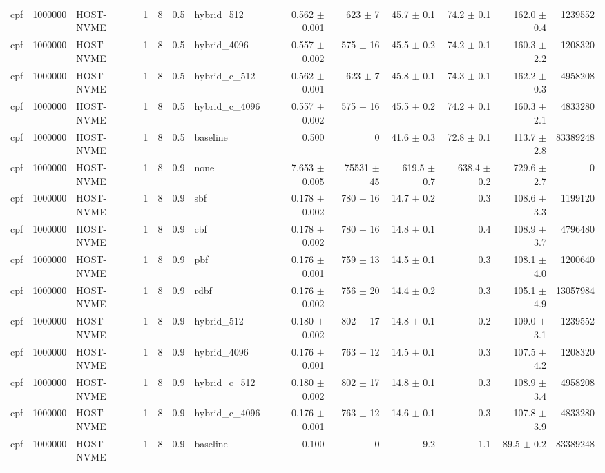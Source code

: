 \begin{tabular}{lllllllrrrrrr}
cpf & 1000000 & HOST-NVME & 1 & 8 & 0.5 & hybrid\_512 & 0.562 $\pm$ 0.001 & 623 $\pm$ 7 & 45.7 $\pm$ 0.1 & 74.2 $\pm$ 0.1 & 162.0 $\pm$ 0.4 & 1239552 \\
cpf & 1000000 & HOST-NVME & 1 & 8 & 0.5 & hybrid\_4096 & 0.557 $\pm$ 0.002 & 575 $\pm$ 16 & 45.5 $\pm$ 0.2 & 74.2 $\pm$ 0.1 & 160.3 $\pm$ 2.2 & 1208320 \\
cpf & 1000000 & HOST-NVME & 1 & 8 & 0.5 & hybrid\_c\_512 & 0.562 $\pm$ 0.001 & 623 $\pm$ 7 & 45.8 $\pm$ 0.1 & 74.3 $\pm$ 0.1 & 162.2 $\pm$ 0.3 & 4958208 \\
cpf & 1000000 & HOST-NVME & 1 & 8 & 0.5 & hybrid\_c\_4096 & 0.557 $\pm$ 0.002 & 575 $\pm$ 16 & 45.5 $\pm$ 0.2 & 74.2 $\pm$ 0.1 & 160.3 $\pm$ 2.1 & 4833280 \\
cpf & 1000000 & HOST-NVME & 1 & 8 & 0.5 & baseline & 0.500 & 0 & 41.6 $\pm$ 0.3 & 72.8 $\pm$ 0.1 & 113.7 $\pm$ 2.8 & 83389248 \\
cpf & 1000000 & HOST-NVME & 1 & 8 & 0.9 & none & 7.653 $\pm$ 0.005 & 75531 $\pm$ 45 & 619.5 $\pm$ 0.7 & 638.4 $\pm$ 0.2 & 729.6 $\pm$ 2.7 & 0 \\
cpf & 1000000 & HOST-NVME & 1 & 8 & 0.9 & sbf & 0.178 $\pm$ 0.002 & 780 $\pm$ 16 & 14.7 $\pm$ 0.2 & 0.3 & 108.6 $\pm$ 3.3 & 1199120 \\
cpf & 1000000 & HOST-NVME & 1 & 8 & 0.9 & cbf & 0.178 $\pm$ 0.002 & 780 $\pm$ 16 & 14.8 $\pm$ 0.1 & 0.4 & 108.9 $\pm$ 3.7 & 4796480 \\
cpf & 1000000 & HOST-NVME & 1 & 8 & 0.9 & pbf & 0.176 $\pm$ 0.001 & 759 $\pm$ 13 & 14.5 $\pm$ 0.1 & 0.3 & 108.1 $\pm$ 4.0 & 1200640 \\
cpf & 1000000 & HOST-NVME & 1 & 8 & 0.9 & rdbf & 0.176 $\pm$ 0.002 & 756 $\pm$ 20 & 14.4 $\pm$ 0.2 & 0.3 & 105.1 $\pm$ 4.9 & 13057984 \\
cpf & 1000000 & HOST-NVME & 1 & 8 & 0.9 & hybrid\_512 & 0.180 $\pm$ 0.002 & 802 $\pm$ 17 & 14.8 $\pm$ 0.1 & 0.2 & 109.0 $\pm$ 3.1 & 1239552 \\
cpf & 1000000 & HOST-NVME & 1 & 8 & 0.9 & hybrid\_4096 & 0.176 $\pm$ 0.001 & 763 $\pm$ 12 & 14.5 $\pm$ 0.1 & 0.3 & 107.5 $\pm$ 4.2 & 1208320 \\
cpf & 1000000 & HOST-NVME & 1 & 8 & 0.9 & hybrid\_c\_512 & 0.180 $\pm$ 0.002 & 802 $\pm$ 17 & 14.8 $\pm$ 0.1 & 0.3 & 108.9 $\pm$ 3.4 & 4958208 \\
cpf & 1000000 & HOST-NVME & 1 & 8 & 0.9 & hybrid\_c\_4096 & 0.176 $\pm$ 0.001 & 763 $\pm$ 12 & 14.6 $\pm$ 0.1 & 0.3 & 107.8 $\pm$ 3.9 & 4833280 \\
cpf & 1000000 & HOST-NVME & 1 & 8 & 0.9 & baseline & 0.100 & 0 & 9.2 & 1.1 & 89.5 $\pm$ 0.2 & 83389248 \\

\end{tabular}
